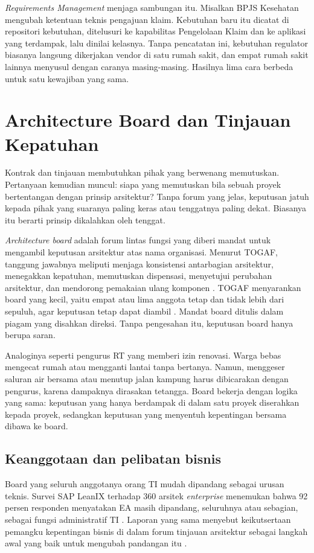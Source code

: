 \textit{Requirements Management} menjaga sambungan itu. Misalkan BPJS
Kesehatan mengubah ketentuan teknis pengajuan klaim. Kebutuhan baru itu
dicatat di repositori kebutuhan, ditelusuri ke kapabilitas Pengelolaan
Klaim dan ke aplikasi yang terdampak, lalu dinilai kelasnya. Tanpa
pencatatan ini, kebutuhan regulator biasanya langsung dikerjakan vendor di
satu rumah sakit, dan empat rumah sakit lainnya menyusul dengan caranya
masing-masing. Hasilnya lima cara berbeda untuk satu kewajiban yang sama.

\section{Architecture Board dan Tinjauan Kepatuhan}

Kontrak dan tinjauan membutuhkan pihak yang berwenang memutuskan. Pertanyaan
kemudian muncul: siapa yang memutuskan bila sebuah proyek bertentangan
dengan prinsip arsitektur? Tanpa forum yang jelas, keputusan jatuh kepada
pihak yang suaranya paling keras atau tenggatnya paling dekat. Biasanya itu
berarti prinsip dikalahkan oleh tenggat.

\textit{Architecture board} adalah forum lintas fungsi yang diberi mandat
untuk mengambil keputusan arsitektur atas nama organisasi. Menurut TOGAF,
tanggung jawabnya meliputi menjaga konsistensi antarbagian arsitektur,
menegakkan kepatuhan, memutuskan dispensasi, menyetujui perubahan
arsitektur, dan mendorong pemakaian ulang komponen \cite{togaf10}. TOGAF
menyarankan board yang kecil, yaitu empat atau lima anggota tetap dan tidak
lebih dari sepuluh, agar keputusan tetap dapat diambil \cite{togaf10}.
Mandat board ditulis dalam piagam yang disahkan direksi. Tanpa pengesahan
itu, keputusan board hanya berupa saran.

Analoginya seperti pengurus RT yang memberi izin renovasi. Warga bebas
mengecat rumah atau mengganti lantai tanpa bertanya. Namun, menggeser
saluran air bersama atau menutup jalan kampung harus dibicarakan dengan
pengurus, karena dampaknya dirasakan tetangga. Board bekerja dengan logika
yang sama: keputusan yang hanya berdampak di dalam satu proyek diserahkan
kepada proyek, sedangkan keputusan yang menyentuh kepentingan bersama
dibawa ke board.

\subsection*{Keanggotaan dan pelibatan bisnis}

Board yang seluruh anggotanya orang TI mudah dipandang sebagai urusan
teknis. Survei SAP LeanIX terhadap 360 arsitek \textit{enterprise} menemukan
bahwa 92 persen responden menyatakan EA masih dipandang, seluruhnya atau
sebagian, sebagai fungsi administratif TI \cite{leanix2025}. Laporan yang
sama menyebut keikutsertaan pemangku kepentingan bisnis di dalam forum
tinjauan arsitektur sebagai langkah awal yang baik untuk mengubah pandangan
itu \cite{leanix2025}.

